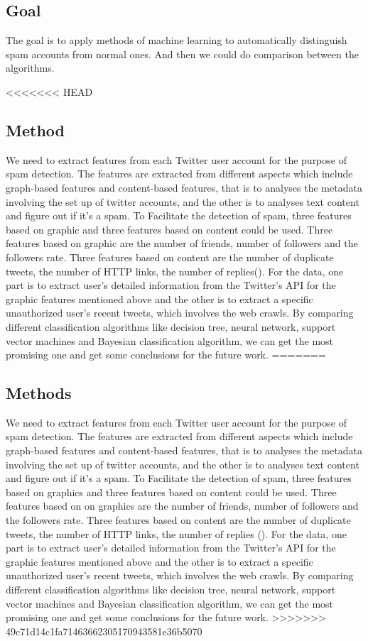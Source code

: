 \documentclass[../proposal.tex]{subfiles}
\begin{document}
\subsection{Goal}
The goal is to apply methods of machine learning to automatically distinguish
spam accounts from normal ones. And then we could do comparison between the
algorithms.

<<<<<<< HEAD
\subsection{Method}
We need to extract features from each Twitter user account for the purpose of spam detection. The features are extracted from different aspects which include graph-based features and content-based features, that is to analyses the metadata involving the set up of twitter accounts, and the other is to analyses text content and figure out if it’s a spam. To Facilitate the detection of spam,  three features based on graphic and three features based on content could be used. Three features based on graphic are the number of friends, number of followers and the followers rate. Three features based on content are the number of duplicate tweets, the number of HTTP links, the number of replies(\cite{wang2010detecting}). For the data, one part is to extract user's detailed information from the Twitter's API for the graphic features mentioned above and the other is to extract a specific unauthorized user's recent tweets, which involves the web crawls. By comparing different classification algorithms like decision tree, neural network, support vector machines and Bayesian classification algorithm, we can get the most promising one and get some conclusions for the future work.
=======
\subsection{Methods}
We need to extract features from each Twitter user account for the purpose of
spam detection. The features are extracted from different aspects which include
graph-based features and content-based features, that is to analyses the
metadata involving the set up of twitter accounts, and the other is to analyses
text content and figure out if it’s a spam. To Facilitate the detection of
spam,  three features based on graphics and three features based on content
could be used. Three features based on on graphics are the number of friends,
number of followers and the followers rate. Three features based on content are
the number of duplicate tweets, the number of HTTP links, the number of
replies (\cite{wang2010don}). For the data, one part is to extract user's
detailed information from the Twitter's API for the graphic features mentioned
above and the other is to extract a specific unauthorized user's recent tweets,
which involves the web crawls. By comparing different classification algorithms
like decision tree, neural network, support vector machines and Bayesian
classification algorithm, we can get the most promising one and get some
conclusions for the future work.
>>>>>>> 49c71d14c1fa71463662305170943581e36b5070
\end{document}

